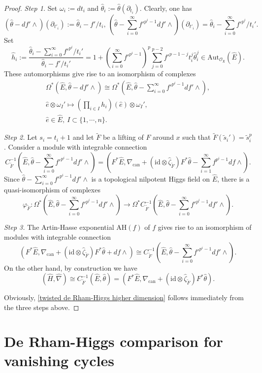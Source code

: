 \documentclass[12pt, a4paper]{article}
\begin{document}
\begin{proof}
 {\itshape Step 1.}  Set $\omega_i:=dt_i$ and $\hat\theta_i:=\hat\theta(\partial_{t_i})$.  Clearly, one has
 $$
( \hat\theta-df'\wedge)(\partial_{t'_i}):=\hat\theta_i-f'/t_i,~(\hat\theta-\sum_{i=0}^\infty f'^{p^i-1}df'\wedge)(\partial_{t'_i})=\hat\theta_i-\sum_{i=0}^\infty f'^{p^i}/t_i'.
 $$
 Set
$$
\hat h_i:=\frac{\hat\theta_i-\sum_{i=0}^\infty f'^{p^i}/t_i'}{\hat\theta_i-f'/t_i'}=1+(\sum_{i=0}^\infty f'^{p^i-1})^p\sum_{j=0}^{p-2} f'^{p-1-j}t_i^j\hat\theta^j_i\in\mathrm{Aut}_{\mathcal O_{\mathfrak X}}(\hat E).
$$
These automorphisms give rise to an isomorphism of complexes 
 $$
 \begin{array}{c}
 \Omega^*(\hat E,\hat\theta-df'\wedge)\cong\Omega^*(\hat E,\hat\theta-\sum_{i=0}^\infty f'^{p^i-1}df'\wedge),\\
 \hat e\otimes\omega_I'\mapsto(\prod_{i\in I}h_i)(\hat e)\otimes\omega_I',\\
 \hat e\in\hat E,~I\subset\{1,\cdots,n\}.
 \end{array}
 $$
 
 {\itshape Step 2.} Let $s_i=t_i+1$ and let $\tilde F$ be a lifting of $F$ around $x$ such that $\tilde F(\tilde s_i')=\tilde s_i^p$. Consider a module with integrable connection 
 $$
C^{-1}_{\tilde F}(\hat E,\hat\theta-\sum_{i=0}^\infty f'^{p^i-1}df'\wedge)=(F^*\hat E,\nabla_\mathrm{can}
 +(\mathrm{id}\otimes\hat\zeta_{\tilde F})F^*\hat\theta-\sum_{i=1}^\infty f^{p^i-1}df\wedge).$$
 Since $\hat\theta-\sum_{i=0}^\infty f'^{p^i-1}df'\wedge$ is a topological nilpotent Higgs field on $\hat E$, there is a quasi-isomorphism of complexes
 $$
\varphi_{\tilde F}:\Omega^*(\hat E,\hat\theta-\sum_{i=0}^\infty f'^{p^i-1}df'\wedge)\to\Omega^*C^{-1}_{\tilde F}(\hat E,\hat\theta-\sum_{i=0}^\infty f'^{p^i-1}df'\wedge).$$

{\itshape Step 3.} The Artin-Hasse exponential $\mathrm{AH}(f)$ of $f$ gives rise to an isomorphism of modules with integrable connection
$$
(F^*\hat E,\nabla_\mathrm{can}
 +(\mathrm{id}\otimes\hat\zeta_{\tilde F})F^*\hat\theta+df\wedge)\cong C^{-1}_{\tilde F}(\hat E,\hat\theta-\sum_{i=0}^\infty f'^{p^i-1}df'\wedge).
 $$
 On the other hand, by construction we have
 $$
 (\hat H,\hat\nabla)\cong C^{-1}_{\tilde F}(\hat E,\hat\theta)=(F^*\hat E,\nabla_\mathrm{can}
 +(\mathrm{id}\otimes\hat\zeta_{\tilde F})F^*\hat\theta).$$
 
 Obviously, \eqref{twisted de Rham-Higgs higher dimension} follows immediately from the three steps above. \fi
 \end{proof}

\section{De Rham-Higgs comparison for vanishing cycles \uppercase\expandafter{}}
\end{document}
